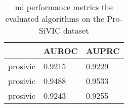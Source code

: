 \begin{table}[]
\begin{tabular}{|l|l|l|}
\hline
      & AUROC & AUPRC \\ \hline
prosivic & 0.9215  & 0.9229  \\ \hline
prosivic & 0.9488  & 0.9533  \\ \hline
prosivic & 0.9243  & 0.9255  \\ \hline
\end{tabular}
\caption{\gls{nd} performance metrics the evaluated algorithms on the Pro-SiVIC dataset}
\label{tab:results prosivic}
\end{table}
